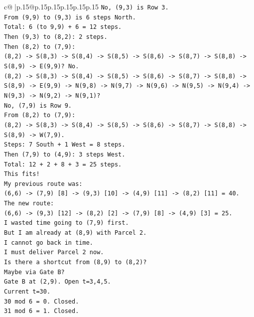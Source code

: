 \documentclass{article}
\begin{document}
{\begin{supertabular}{c@{$\;$}|p{.15\linewidth}@{}p{.15\linewidth}p{.15\linewidth}p{.15\linewidth}p{.15\linewidth}p{.15\linewidth}}
{{{\texttt{No, (9,3) is Row 3.} \\
\texttt{From (9,9) to (9,3) is 6 steps North.} \\
\texttt{Total: 6 (to 9,9) + 6 = 12 steps.} \\
\texttt{Then (9,3) to (8,2): 2 steps.} \\
\texttt{Then (8,2) to (7,9):} \\
\texttt{(8,2) {-}> S(8,3) {-}> S(8,4) {-}> S(8,5) {-}> S(8,6) {-}> S(8,7) {-}> S(8,8) {-}> S(8,9) {-}> E(9,9)? No.} \\
\texttt{(8,2) {-}> S(8,3) {-}> S(8,4) {-}> S(8,5) {-}> S(8,6) {-}> S(8,7) {-}> S(8,8) {-}> S(8,9) {-}> E(9,9) {-}> N(9,8) {-}> N(9,7) {-}> N(9,6) {-}> N(9,5) {-}> N(9,4) {-}> N(9,3) {-}> N(9,2) {-}> N(9,1)?} \\
\texttt{No, (7,9) is Row 9.} \\
\texttt{From (8,2) to (7,9):} \\
\texttt{(8,2) {-}> S(8,3) {-}> S(8,4) {-}> S(8,5) {-}> S(8,6) {-}> S(8,7) {-}> S(8,8) {-}> S(8,9) {-}> W(7,9).} \\
\texttt{Steps: 7 South + 1 West = 8 steps.} \\
\texttt{Then (7,9) to (4,9): 3 steps West.} \\
\texttt{Total: 12 + 2 + 8 + 3 = 25 steps.} \\
\texttt{This fits!} \\
\texttt{My previous route was:} \\
\texttt{(6,6) {-}> (7,9) {[}8{]} {-}> (9,3) {[}10{]} {-}> (4,9) {[}11{]} {-}> (8,2) {[}11{]} = 40.} \\
\texttt{The new route:} \\
\texttt{(6,6) {-}> (9,3) {[}12{]} {-}> (8,2) {[}2{]} {-}> (7,9) {[}8{]} {-}> (4,9) {[}3{]} = 25.} \\
\texttt{I wasted time going to (7,9) first.} \\
\texttt{But I am already at (8,9) with Parcel 2.} \\
\texttt{I cannot go back in time.} \\
\texttt{I must deliver Parcel 2 now.} \\
\texttt{Is there a shortcut from (8,9) to (8,2)?} \\
\texttt{Maybe via Gate B?} \\
\texttt{Gate B at (2,9). Open t=3,4,5.} \\
\texttt{Current t=30.} \\
\texttt{30 mod 6 = 0. Closed.} \\
\texttt{31 mod 6 = 1. Closed.} \\
}}}
\end{supertabular}}
\end{document}
